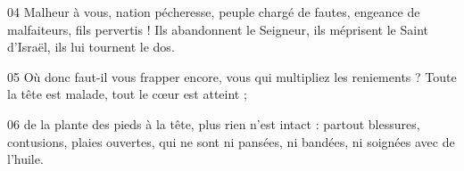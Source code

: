 
04 Malheur à vous, nation pécheresse, peuple chargé de fautes, engeance de malfaiteurs, fils pervertis ! Ils abandonnent le Seigneur, ils méprisent le Saint d’Israël, ils lui tournent le dos.

05 Où donc faut-il vous frapper encore, vous qui multipliez les reniements ? Toute la tête est malade, tout le cœur est atteint ;

06 de la plante des pieds à la tête, plus rien n’est intact : partout blessures, contusions, plaies ouvertes, qui ne sont ni pansées, ni bandées, ni soignées avec de l’huile.
